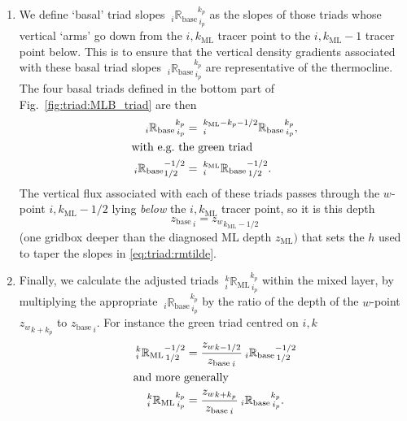 \documentclass[NEMO_book]{subfiles}
\begin{document}
\begin{enumerate}
\item We define `basal' triad slopes
${\:}_i{\mathbb{R}_\mathrm{base}}_{\,i_p}^{k_p}$ as the slopes
of those triads whose vertical `arms' go down from the
$i,k_\mathrm{ML}$ tracer point to the $i,k_\mathrm{ML}-1$ tracer point
below. This is to ensure that the vertical density gradients
associated with these basal triad slopes
${\:}_i{\mathbb{R}_\mathrm{base}}_{\,i_p}^{k_p}$ are
representative of the thermocline. The four basal triads defined in the bottom part
of Fig.~\ref{fig:triad:MLB_triad} are then
\begin{align}
  {\:}_i{\mathbb{R}_\mathrm{base}}_{\,i_p}^{k_p} &=
 {\:}^{k_\mathrm{ML}-k_p-1/2}_i{\mathbb{R}_\mathrm{base}}_{\,i_p}^{k_p}, \label{eq:triad:Rbase}
\\
\intertext{with e.g.\ the green triad}
{\:}_i{\mathbb{R}_\mathrm{base}}_{1/2}^{-1/2}&=
{\:}^{k_\mathrm{ML}}_i{\mathbb{R}_\mathrm{base}}_{\,1/2}^{-1/2}. \notag
\end{align}
The vertical flux associated with each of these triads passes through the $w$-point
$i,k_\mathrm{ML}-1/2$ lying \emph{below} the $i,k_\mathrm{ML}$ tracer point,
so it is this depth
\begin{equation}
  \label{eq:triad:zbase}
  {z_\mathrm{base}}_{\,i}={z_{w}}_{k_\mathrm{ML}-1/2}
\end{equation}
(one gridbox deeper than the
diagnosed ML depth $z_\mathrm{ML})$ that sets the $h$ used to taper
the slopes in \eqref{eq:triad:rmtilde}.
\item Finally, we calculate the adjusted triads
${\:}_i^k{\mathbb{R}_\mathrm{ML}}_{\,i_p}^{k_p}$ within the mixed
layer, by multiplying the appropriate
${\:}_i{\mathbb{R}_\mathrm{base}}_{\,i_p}^{k_p}$ by the ratio of
the depth of the $w$-point ${z_w}_{k+k_p}$ to ${z_\mathrm{base}}_{\,i}$. For
instance the green triad centred on $i,k$
\begin{align}
  {\:}_i^k{\mathbb{R}_\mathrm{ML}}_{\,1/2}^{-1/2} &=
\frac{{z_w}_{k-1/2}}{{z_\mathrm{base}}_{\,i}}{\:}_i{\mathbb{R}_\mathrm{base}}_{\,1/2}^{-1/2}
\notag \\
\intertext{and more generally}
 {\:}_i^k{\mathbb{R}_\mathrm{ML}}_{\,i_p}^{k_p} &=
\frac{{z_w}_{k+k_p}}{{z_\mathrm{base}}_{\,i}}{\:}_i{\mathbb{R}_\mathrm{base}}_{\,i_p}^{k_p}.\label{eq:triad:RML}
\end{align}
\end{enumerate}
\end{document}
